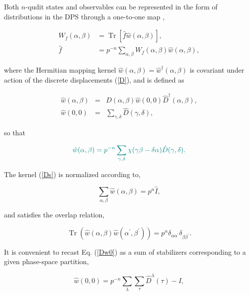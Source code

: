 \documentclass[quantumrep,article,submit,pdftex,moreauthors]{Definitions/mdpi}
\DeclareMathOperator{\Tr}{Tr}
\begin{document}
Both $n$-qudit states and observables can be represented in the form of
distributions in the DPS through a one-to-one map
\cite{gross,DFW2-1,DFW2-2,DFW2-3,DFW2-4},

\begin{align}
  W_{f}\left( \alpha ,\beta \right)
  &= \Tr \left[ \hat{f}\hat{w}\left(\alpha ,\beta \right) \right],
  \label{map} \\
  \hat{f}
  &= p^{-n}\sum_{\alpha, \beta } W_{f}(\alpha,\beta) \hat{w}(\alpha,\beta),
\end{align}

where the Hermitian mapping kernel $\hat{w}\left( \alpha ,\beta \right) =
\hat{w}^{\dagger }(\alpha ,\beta )$ is covariant under action of the discrete
displacements (\ref{D}), and is defined as

\begin{eqnarray}
  \hat{w}\left( \alpha ,\beta \right)  &=&\hat{D}\left( \alpha ,\beta \right) 
  \hat{w}\left( 0,0\right) \hat{D}^{\dagger }\left( \alpha ,\beta \right) ,
  \label{Ds} \\
  \hat{w}\left( 0,0\right)  &=&\sum_{\gamma ,\delta }\hat{D}(\gamma ,\delta ),
  \label{Dw0}
\end{eqnarray}

{\color{teal} so that}

\begin{equation}
  \color{teal}
  \hat{w} \left( \alpha, \beta \right)
  = p^{-n} \sum_{\gamma, \delta}
  \chi(\gamma \beta -\delta \alpha) \hat{D}(\gamma, \delta).
  \label{wabD}
\end{equation}

The kernel (\ref{Ds}) is normalized according to,

\begin{equation}
  \sum_{\alpha,\beta}\hat{w}\left(\alpha,\beta\right)
  = p^{n}\hat{I},
\end{equation}

and satisfies the overlap relation,

\begin{equation}
  \Tr\left(\hat{w}(\alpha,\beta)\hat{w}(\alpha^{\prime},\beta^{\prime})\right)
  = p^{n} \delta_{\alpha \alpha^{\prime}} \delta_{\beta\beta^{\prime}}.
\end{equation}

It is convenient to recast Eq. (\ref{Dw0}) as a sum of stabilizers corresponding
to a given phase-space partition,

\begin{equation}
  \hat{w}\left(0,0\right)
  = p^{-n} \sum_{\lambda} \sum_{\tau} \hat{D}^{\lambda}(\tau)-\hat{I},
  \label{Dw00}
\end{equation}
\end{document}
